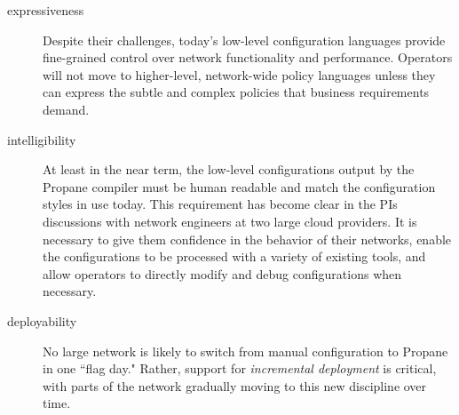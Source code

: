 

\begin{description}
\item[expressiveness]  Despite their challenges, today's low-level configuration languages provide fine-grained control over network functionality and performance.  Operators will not move to higher-level, network-wide policy languages unless they can express the subtle and complex policies that business requirements demand.  

\item[intelligibility] At least in the near term, the low-level configurations output by the Propane compiler must be human readable and match the configuration styles in use today.  This requirement has become clear in the PIs discussions with network engineers at two large cloud providers.  It is necessary to give them confidence in the behavior of their networks, enable the configurations to be processed with a variety of existing tools, and allow operators to directly modify and debug configurations when necessary.  

\item[deployability] No large network is likely to switch from manual configuration to Propane in one ``flag day."   Rather, support for {\em incremental deployment} is critical, with parts of the network gradually moving to this new discipline over time.

\end{description}

